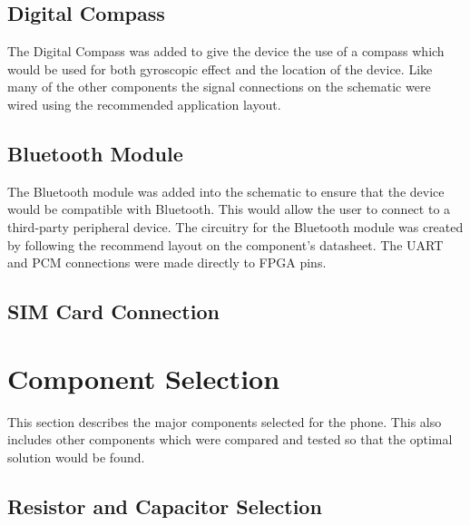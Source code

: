\subsection{Digital Compass}

	The Digital Compass was added to give the device the use of a compass which would be used for both gyroscopic effect and the location of the device.
Like many of the other components the signal connections on the schematic were wired using the recommended application layout. 

\subsection{Bluetooth Module}

	The Bluetooth module was added into the schematic to ensure that the device would be compatible with Bluetooth. This would allow the user to connect to a third-party peripheral device.
The circuitry for the Bluetooth module was created by following the recommend layout on the component's datasheet. The UART and PCM connections were made directly to FPGA pins. 

\subsection{SIM Card Connection}
\label{chap:SIM}
	

\section{Component Selection} 
	
	This section describes the major components selected for the phone. This also includes other components which were compared and tested so that the optimal solution would be found. 


\subsection{Resistor and Capacitor Selection}

